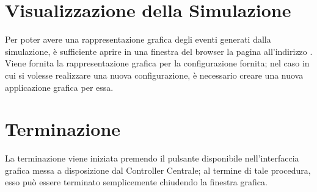 	\section{Visualizzazione della Simulazione}
	
	Per poter avere una rappresentazione grafica degli eventi generati dalla simulazione, è sufficiente aprire in una finestra del browser  la pagina all'indirizzo .
	Viene fornita la rappresentazione grafica per la configurazione fornita; nel caso in cui si volesse realizzare una nuova configurazione, è necessario creare una nuova applicazione grafica per essa.
	
	\section{Terminazione}
	
	La terminazione viene iniziata premendo il pulsante  disponibile nell'interfaccia grafica messa a disposizione dal Controller Centrale; al termine di tale procedura, esso può essere terminato semplicemente chiudendo la finestra grafica.
